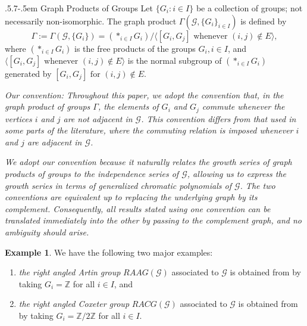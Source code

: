 \documentclass[11pt,reqno]{amsart}
\makeatletter
\numberwithin{equation}{section} %
\theoremstyle{definition}
\newtheorem{example}{Example}
\theoremstyle{remark}
\numberwithin{equation}{section}
\def\subsection{\def\@secnumfont{\bfseries}\@startsection{subsection}{2}%
  {\parindent}{.5\linespacing\@plus.7\linespacing}{-.5em}%
  {\normalfont\bfseries}}
\makeatother
\begin{document}
\subsection{Graph Products of Groups}
Let $\{G_i : i\in I\}$ be a collection of groups; not necessarily non-isomorphic.  The graph product $\Gamma(\mathcal G, \{G_i\}_{i\in I}) $ is defined by 
\begin{equation*}
 \Gamma:=\Gamma(\mathcal G, \{G_i\}) = \left( \ast_{i \in I} G_i \right) \Big/ \langle [G_i, G_j]  \text{ whenever } (i,j) \notin E \rangle,
\end{equation*}
where $\left( \ast_{i \in I} G_i \right) $ is the free products of the groups $G_i, i\in I$, and  $\langle [G_i, G_j] \text{ whenever } (i,j) \notin E \rangle$ is the normal subgroup of 
$\left( \ast_{i \in I} G_i \right) $ generated by $[G_i, G_j] \text{ for } (i,j) \notin E$.

\textit{Our convention: Throughout this paper, we adopt the convention that, in the graph product of groups $\Gamma$, the elements of $G_i$ and $G_j$ commute whenever the vertices $i$ and $j$ are not adjacent in $\mathcal G$. This convention differs from that used in some parts of the literature, where the commuting relation is imposed whenever $i$ and $j$ are adjacent in $\mathcal{G}$. }

\noindent
\textit{
We adopt our convention because it naturally relates the growth series of graph products of groups to the independence series of $\mathcal{G}$, allowing us to express the growth series in terms of generalized chromatic polynomials of $\mathcal{G}$. The two conventions are equivalent up to replacing the underlying graph by its complement. Consequently, all results stated using one convention can be translated immediately into the other by passing to the complement graph, and no ambiguity should arise. }


\begin{example} We have the following two major examples:
\begin{enumerate}
    \item     \emph{the right angled Artin group} $RAAG(\mathcal G)$ associated to $\mathcal{G}$ is obtained from by taking $G_i = \mathbb Z$ for all $i \in I$, and
\item  \emph{the right angled  Coxeter group} $RACG(\mathcal G)$ associated to $\mathcal{G}$ is obtained from by taking $G_i = \mathbb Z/2\mathbb Z$ for all $i \in I$.
\end{enumerate}
\end{example}
\end{document}
